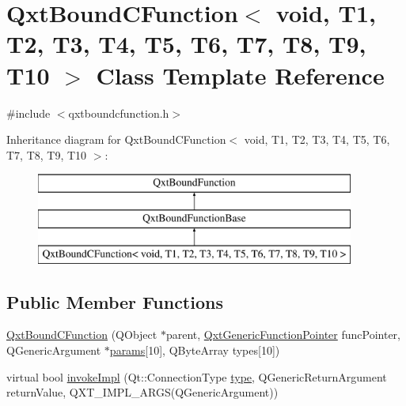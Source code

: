 \hypertarget{class_qxt_bound_c_function_3_01void_00_01_t1_00_01_t2_00_01_t3_00_01_t4_00_01_t5_00_01_t6_00_01_e4575a50989f1ee70eb922dd1051fedb}{\section{Qxt\-Bound\-C\-Function$<$ void, T1, T2, T3, T4, T5, T6, T7, T8, T9, T10 $>$ Class Template Reference}
\label{class_qxt_bound_c_function_3_01void_00_01_t1_00_01_t2_00_01_t3_00_01_t4_00_01_t5_00_01_t6_00_01_e4575a50989f1ee70eb922dd1051fedb}
}


{\ttfamily \#include $<$qxtboundcfunction.\-h$>$}

Inheritance diagram for Qxt\-Bound\-C\-Function$<$ void, T1, T2, T3, T4, T5, T6, T7, T8, T9, T10 $>$\-:\begin{figure}[H]
\begin{center}
\leavevmode
\includegraphics[height=3.000000cm]{class_qxt_bound_c_function_3_01void_00_01_t1_00_01_t2_00_01_t3_00_01_t4_00_01_t5_00_01_t6_00_01_e4575a50989f1ee70eb922dd1051fedb}
\end{center}
\end{figure}
\subsection*{Public Member Functions}
\begin{DoxyCompactItemize}
\item 
\hyperlink{class_qxt_bound_c_function_3_01void_00_01_t1_00_01_t2_00_01_t3_00_01_t4_00_01_t5_00_01_t6_00_01_e4575a50989f1ee70eb922dd1051fedb_aa30250af0d4f24631df65ad8710bc877}{Qxt\-Bound\-C\-Function} (Q\-Object $\ast$parent, \hyperlink{class_qxt_generic_function_pointer}{Qxt\-Generic\-Function\-Pointer} func\-Pointer, Q\-Generic\-Argument $\ast$\hyperlink{glext_8h_afeb6390ab3bc8a0e96a88aff34d52288}{params}\mbox{[}10\mbox{]}, Q\-Byte\-Array types\mbox{[}10\mbox{]})
\item 
virtual bool \hyperlink{class_qxt_bound_c_function_3_01void_00_01_t1_00_01_t2_00_01_t3_00_01_t4_00_01_t5_00_01_t6_00_01_e4575a50989f1ee70eb922dd1051fedb_a918b9a64e057082fe7e4a15448a790b0}{invoke\-Impl} (Qt\-::\-Connection\-Type \hyperlink{glext_8h_a7d05960f4f1c1b11f3177dc963a45d86}{type}, Q\-Generic\-Return\-Argument return\-Value, Q\-X\-T\-\_\-\-I\-M\-P\-L\-\_\-A\-R\-G\-S(Q\-Generic\-Argument))
\end{DoxyCompactItemize}
